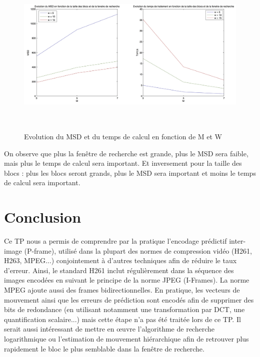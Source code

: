 \documentclass[a4paper, 12pt]{article}
\begin{document}
\begin{figure}[H]
	\centering
	\includegraphics[height=8cm]{../Resultats/Garden/garden_graph.jpg}
	\caption{Evolution du MSD et du temps de calcul en fonction de M et W}
	\label{fig:garden_graph}
\end{figure}

On observe que plus la fenêtre de recherche est grande, plus le MSD sera faible, mais plus le temps de calcul sera important. Et inversement pour la taille des blocs : plus les blocs seront grands, plus le MSD sera important et moins le temps de calcul sera important.



\newpage

\section{Conclusion}

Ce TP nous a permis de comprendre par la pratique l'encodage prédictif inter-image (P-frame), utilisé dans la plupart des normes de compression vidéo (H261, H263, MPEG...) conjointement à d'autres techniques afin de réduire le taux d'erreur. Ainsi, le standard H261 inclut régulièrement dans la séquence des images encodées en suivant le principe de la norme JPEG (I-Frames). La norme MPEG ajoute aussi des frames bidirectionnelles. 
En pratique, les vecteurs de mouvement ainsi que les erreurs de prédiction sont encodés afin de supprimer des bits de redondance (en utilisant notamment une transformation par DCT, une quantification scalaire...) mais cette étape n'a pas été traitée lors de ce TP.
Il serait aussi intéressant de mettre en œuvre l'algorithme de recherche logarithmique ou l'estimation de mouvement hiérarchique afin de retrouver plus rapidement le bloc le plus semblable dans la fenêtre de recherche.
\end{document}
